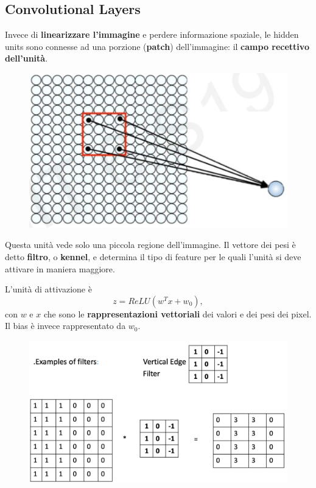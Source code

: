 \subsection{Convolutional Layers}
Invece di \textbf{linearizzare l'immagine} e perdere informazione spaziale, le hidden units sono connesse ad una porzione (\textbf{patch}) dell'immagine: il \textbf{campo recettivo dell'unità}.
\begin{figure}[!h]
    \includegraphics[scale=.5]{images/cnn/conv_layer.png}
    \centering
\end{figure}



Questa unità vede solo una piccola regione dell'immagine. Il vettore dei pesi è detto \textbf{filtro}, o \textbf{kennel}, e determina il tipo di feature per le quali l'unità si deve attivare in maniera maggiore.



L'unità di attivazione è
\begin{equation}
    z=ReLU(w^Tx+w_0),
\end{equation}
con $w$ e $x$ che sono le \textbf{rappresentazioni vettoriali} dei valori e dei pesi dei pixel. Il bias è invece rappresentato da $w_0$. 
\begin{figure}[!h]
    \includegraphics[scale=.5]{images/cnn/filter_ex.png}
    \centering
\end{figure}
\newpage
